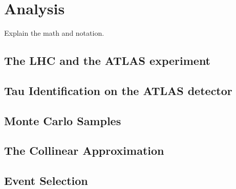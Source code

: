 \chapter{Analysis}\label{chap:background}
Explain the math and notation.



\section{The LHC and the ATLAS experiment}

\section{Tau Identification on the ATLAS detector}

\section{Monte Carlo Samples}

\section{The Collinear Approximation}

\section{Event Selection}